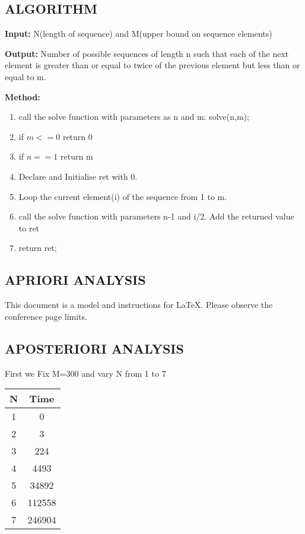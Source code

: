 \documentclass[conference]{IEEEtran}
\begin{document}
\subsection{ALGORITHM }

\textbf{Input:} N(length of sequence) and M(upper bound on sequence elements)

\textbf{Output:} Number of possible sequences of length n such that each of the next element is greater than or equal to twice of the previous element but less than or equal to m.

\textbf{Method:}

\begin{enumerate}
    \item call the solve function with parameters as n and m: solve(n,m);
    \item if $m<=0$ return 0
    \item if $n==1$ return m
    \item Declare and Initialise ret with 0.
    \item Loop the current element(i) of the sequence from 1 to m.
    \setlength{\itemindent}{+.5in}
    \item call the solve function with parameters n-1 and i/2. Add the returned value to ret
    \setlength{\itemindent}{0in}
	\item return ret;
	
\end{enumerate}


\subsection{APRIORI ANALYSIS }

This document is a model and instructions for \LaTeX.
Please observe the conference page limits. 

\subsection{APOSTERIORI ANALYSIS }

First we Fix M=300 and vary N from 1 to 7
\begin{center}
   \begin{tabular}{|c|c|}
   \hline
   N & Time \\
   \hline\hline
    1 & 0 \\
    \hline
    2 & 3 \\
    \hline
    3 & 224 \\
    \hline
    4 & 4493 \\
    \hline
    5 & 34892 \\
    \hline
    6 & 112558 \\
    \hline
    7 & 246904 \\
    \hline
    \end{tabular} 
\end{center}
\end{document}
